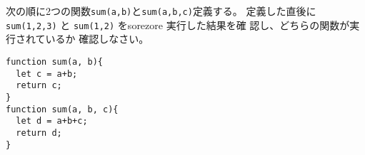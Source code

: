 \begin{Prob}\upshape
 次の順に2つの関数\texttt{sum(a,b)}と\texttt{sum(a,b,c)}定義する。
 定義した直後に \Verb+sum(1,2,3)+ と \Verb+sum(1,2)+ をsorezore
 実行した結果を確
 認し、どちらの関数が実行されているか 確認しなさい。
\begin{Verbatim}
function sum(a, b){
  let c = a+b;
  return c;
}
function sum(a, b, c){
  let d = a+b+c;
  return d;
}
\end{Verbatim}
\end{Prob}

